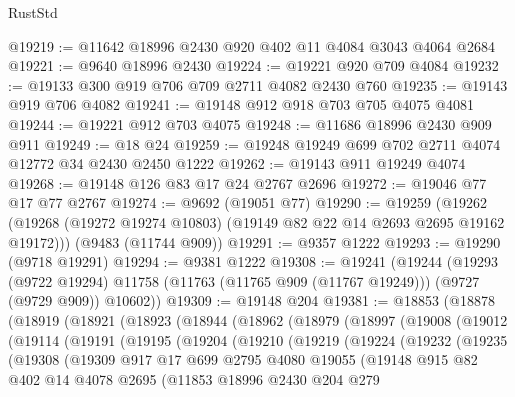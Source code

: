 \begin{lexlean}{RustStd}
\begin{coremodule}
@19219 := @11642 @18996 @2430 @920 @402 @11 @4084 @3043 @4064 @2684
@19221 := @9640 @18996 @2430
@19224 := @19221 @920 @709 @4084
@19232 := @19133 @300 @919 @706 @709 @2711 @4082 @2430 @760
@19235 := @19143 @919 @706 @4082
@19241 := @19148 @912 @918 @703 @705 @4075 @4081
@19244 := @19221 @912 @703 @4075
@19248 := @11686 @18996 @2430 @909 @911
@19249 := @18 @24
@19259 := @19248 @19249 @699 @702 @2711 @4074 @12772 @34 @2430 @2450 @1222
@19262 := @19143 @911 @19249 @4074
@19268 := @19148 @126 @83 @17 @24 @2767 @2696
@19272 := @19046 @77 @17 @77 @2767
@19274 := @9692 (@19051 @77)
@19290 := @19259
    (@19262 (@19268 (@19272 @19274 @10803) (@19149 @82 @22 @14 @2693 @2695 @19162 @19172)))
    (@9483 (@11744 @909))
@19291 := @9357 @1222
@19293 := @19290 (@9718 @19291)
@19294 := @9381 @1222
@19308 := @19241
    (@19244
      (@19293
        (@9722 @19294)
        @11758
        (@11763 (@11765 @909 (@11767 @19249)))
        (@9727 (@9729 @909))
        @10602))
@19309 := @19148 @204
@19381 := @18853
    (@18878
      (@18919
        (@18921
          (@18923
            (@18944
              (@18962
                (@18979
                  (@18997
                    (@19008
                      (@19012
                        (@19114
                          (@19191
                            (@19195
                              (@19204
                                (@19210
                                  (@19219
                                    (@19224
                                      (@19232
                                        (@19235
                                          (@19308
                                            (@19309
                                              @917
                                              @17
                                              @699
                                              @2795
                                              @4080
                                              @19055
                                              (@19148
                                                @915
                                                @82
                                                @402
                                                @14
                                                @4078
                                                @2695
                                                (@11853
                                                  @18996
                                                  @2430
                                                  @204
                                                  @279

\end{coremodule}
\end{lexlean}
